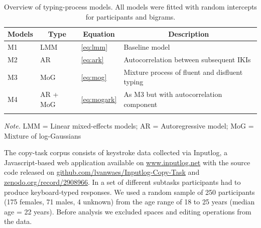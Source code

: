 \documentclass[
  english,
  man,mask,floatsintext]{apa7}
\begin{document}
\begin{table}[bp!]

\begin{center}
\begin{threeparttable}

\caption{\label{tab:models}Overview of typing-process models. All models were fitted with random intercepts for participants and bigrams.}

\begin{tabular}{llll}
\toprule
Models & \multicolumn{1}{c}{Type} & \multicolumn{1}{c}{Equation} & \multicolumn{1}{c}{Description}\\
\midrule
M1 & LMM & \ref{eq:lmm} & Baseline model\\
M2 & AR & \ref{eq:ark} & Autocorrelation between subsequent IKIs\\
M3 & MoG & \ref{eq:mog} & Mixture process of fluent and disfluent typing\\
M4 & AR + MoG & \ref{eq:mogark} & As M3 but with autocorrelation component\\
\bottomrule
\addlinespace
\end{tabular}

\begin{tablenotes}[para]
\normalsize{\textit{Note.} LMM = Linear mixed-effects models; AR = Autoregressive model; MoG = Mixture of log-Gaussians}
\end{tablenotes}

\end{threeparttable}
\end{center}

\end{table}

The copy-task corpus consists of keystroke data collected via Inputlog, a Javascript-based web application available on \url{www.inputlog.net} with the source code released on \href{https://github.com/lvanwaes/Inputlog-Copy-Task}{github.com/lvanwaes/Inputlog-Copy-Task} and \href{https://zenodo.org/record/2908966}{zenodo.org/record/2908966}. In a set of different subtasks participants had to produce keyboard-typed responses. We used a random sample of 250 participants (175 females, 71 males, 4 unknown) from the age range of 18 to 25 years (median age = 22 years). Before analysis we excluded spaces and editing operations from the data.
\end{document}
